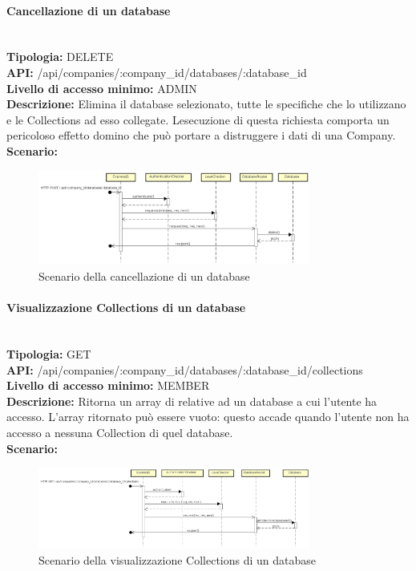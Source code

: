 \paragraph{Cancellazione di un database}\mbox{}\\
\textbf{Tipologia:} DELETE \\
\textbf{API:} /api/companies/:company\_id/databases/:database\_id \\
\textbf{Livello di accesso minimo:} ADMIN \\
\textbf{Descrizione:} Elimina il database selezionato, tutte le specifiche  che lo utilizzano e le Collections ad esso collegate. Lesecuzione di questa richiesta comporta un pericoloso effetto domino che può portare a distruggere i dati di una Company. \\
\textbf{Scenario:} 
\begin{figure}[H]
\centering
\includegraphics[width=0.8\textwidth]{res/sections/backend/sequence/(DELETE)database.png}
\caption{Scenario della cancellazione di un database}
\end{figure}

\newpage
\paragraph{Visualizzazione Collections di un database} \mbox{}\\
\textbf{Tipologia:} GET \\
\textbf{API:} /api/companies/:company\_id/databases/:database\_id/collections \\
\textbf{Livello di accesso minimo:} MEMBER \\
\textbf{Descrizione:} Ritorna un array di  relative ad un database a cui l'utente ha accesso. L'array ritornato può essere vuoto: questo accade quando l'utente non ha accesso a nessuna Collection di quel database. \\
\textbf{Scenario:} 
\begin{figure}[H]
\centering
\includegraphics[width=0.8\textwidth]{res/sections/backend/sequence/(GET)collection.png}
\caption{Scenario della visualizzazione Collections di un database}
\end{figure}

